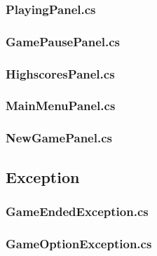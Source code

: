 \subsubsection{PlayingPanel.cs}
\newpage
\subsubsection{GamePausePanel.cs}
\newpage
\subsubsection{HighscoresPanel.cs}
\newpage
\subsubsection{MainMenuPanel.cs}
\newpage
\subsubsection{NewGamePanel.cs}

\newpage
\subsection{Exception}
\subsubsection{GameEndedException.cs}
\newpage
\subsubsection{GameOptionException.cs}

